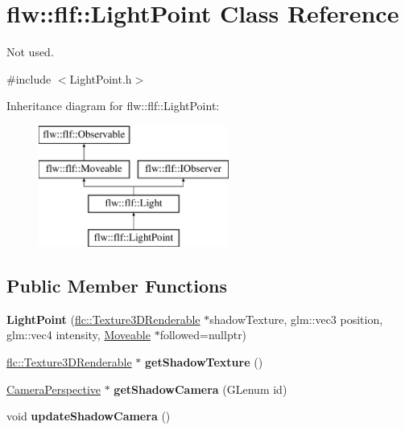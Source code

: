 \hypertarget{classflw_1_1flf_1_1LightPoint}{}\section{flw\+:\+:flf\+:\+:Light\+Point Class Reference}
\label{classflw_1_1flf_1_1LightPoint}


Not used.  




{\ttfamily \#include $<$Light\+Point.\+h$>$}

Inheritance diagram for flw\+:\+:flf\+:\+:Light\+Point\+:\begin{figure}[H]
\begin{center}
\leavevmode
\includegraphics[height=4.000000cm]{classflw_1_1flf_1_1LightPoint}
\end{center}
\end{figure}
\subsection*{Public Member Functions}
\begin{DoxyCompactItemize}
\item 
{\bfseries Light\+Point} (\hyperlink{classflw_1_1flc_1_1Texture3DRenderable}{flc\+::\+Texture3\+D\+Renderable} $\ast$shadow\+Texture, glm\+::vec3 position, glm\+::vec4 intensity, \hyperlink{classflw_1_1flf_1_1Moveable}{Moveable} $\ast$followed=nullptr)\hypertarget{classflw_1_1flf_1_1LightPoint_aced1130b88aa549dd6bd2db34d973676}{}\label{classflw_1_1flf_1_1LightPoint_aced1130b88aa549dd6bd2db34d973676}

\item 
\hyperlink{classflw_1_1flc_1_1Texture3DRenderable}{flc\+::\+Texture3\+D\+Renderable} $\ast$ {\bfseries get\+Shadow\+Texture} ()\hypertarget{classflw_1_1flf_1_1LightPoint_a360693d8884ed0a0265da43d1643b2c1}{}\label{classflw_1_1flf_1_1LightPoint_a360693d8884ed0a0265da43d1643b2c1}

\item 
\hyperlink{classflw_1_1flf_1_1CameraPerspective}{Camera\+Perspective} $\ast$ {\bfseries get\+Shadow\+Camera} (G\+Lenum id)\hypertarget{classflw_1_1flf_1_1LightPoint_a9902ecb1c3140304fb98a48c318ad1ff}{}\label{classflw_1_1flf_1_1LightPoint_a9902ecb1c3140304fb98a48c318ad1ff}

\item 
void {\bfseries update\+Shadow\+Camera} ()\hypertarget{classflw_1_1flf_1_1LightPoint_aa3243fcc69bd0b1c31882dfcc03f2a86}{}\label{classflw_1_1flf_1_1LightPoint_aa3243fcc69bd0b1c31882dfcc03f2a86}

\end{DoxyCompactItemize}
